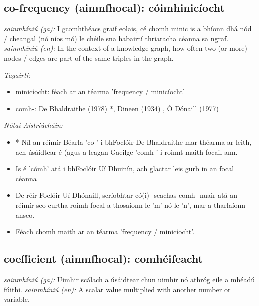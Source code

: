 \documentclass{article}
\begin{document}
\subsection*{co-frequency (ainmfhocal): cóimhinicíocht} 
 \noindent \textit{sainmhíniú (ga):} I gcomhthéacs graif eolais, cé chomh minic is a bhíonn dhá nód / cheangal (nó níos mó) le chéile sna habairtí thriaracha céanna sa ngraf.
\newline\newline
 \noindent \textit{sainmhíniú (en):} In the context of a knowledge graph, how often two (or more) nodes / edges are part of the same triples in the graph.
\newline

 \noindent \textit{Tagairtí:}
\begin{itemize}
	\item minicíocht: féach ar an téarma 'frequency / minicíocht'
	\item comh-: De Bhaldraithe (1978) \cite{de-bhaldraithe}*, Dineen (1934) \cite{dineen}, Ó Dónaill (1977) \cite{odonaill}
\end{itemize}

 \noindent \textit{Nótaí Aistriúcháin:}
\begin{itemize}
	\item * Níl an réimír Béarla 'co-' i bhFoclóir De Bhaldraithe mar théarma ar leith, ach úsáidtear é (agus a leagan Gaeilge 'comh-' i roinnt maith focail ann.
	\item Is é 'cómh' atá i bhFoclóir Uí Dhuinín, ach glactar leis gurb in an focal céanna
	\item De réir Foclóir Uí Dhónaill, scríobhtar có(i)- seachas comh- nuair atá an réimír seo curtha roimh focal a thosaíonn le 'm' nó le 'n', mar a tharlaíonn anseo.
	\item Féach chomh maith ar an téarma 'frequency / minicíocht'.
\end{itemize}


\subsection*{coefficient (ainmfhocal): comhéifeacht} 
 \noindent \textit{sainmhíniú (ga):} Uimhir scálach a úsáidtear chun uimhir nó athróg eile a mhéadú fúithi.
\newline\newline
 \noindent \textit{sainmhíniú (en):} A scalar value multiplied with another number or variable.
\newline
\end{document}
